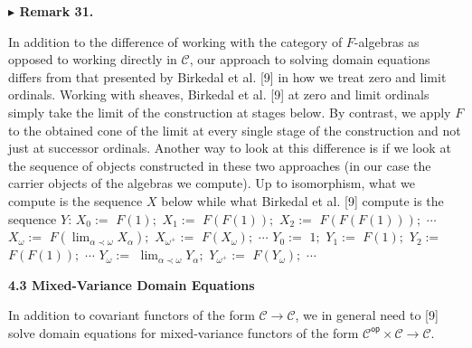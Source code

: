 \documentclass[10pt,a4paper]{article}
\begin{document}
 
 
\par\medskip\noindent\textbf{$\blacktriangleright$ Remark 31.}\par
 
 
In addition to the difference of working with the category of $F$-algebras as opposed to working directly in $\mathcal{C}$, our approach to solving domain equations differs from that presented by Birkedal et al. [9] in how we treat zero and limit ordinals. Working with sheaves, Birkedal et al. [9] at zero and limit ordinals simply take the limit of the construction at stages below. By contrast, we apply $F$ to the obtained cone of the limit at every single stage of the construction and not just at successor ordinals. Another way to look at this difference is if we look at the sequence of objects constructed in these two approaches (in our case the carrier objects of the algebras we compute). Up to isomorphism, what we compute is the sequence $X$ below while what Birkedal et al. [9] compute is the sequence $Y$:      $\displaystyle X_{0}:={}$ $\displaystyle F(1);$ $\displaystyle X_{1}:={}$ $\displaystyle F(F(1));$ $\displaystyle X_{2}:={}$ $\displaystyle F(F(F(1)));$ $\displaystyle\cdots$ $\displaystyle X_{\omega}:={}$ $\displaystyle F(\lim_{\alpha\prec\omega}X_{\alpha});$ $\displaystyle X_{{\omega}^{+}}:={}$ $\displaystyle F(X_{\omega});$ $\displaystyle\cdots$    $\displaystyle Y_{0}:={}$ $\displaystyle 1;$ $\displaystyle Y_{1}:={}$ $\displaystyle F(1);$ $\displaystyle Y_{2}:={}$ $\displaystyle F(F(1));$ $\displaystyle\cdots$ $\displaystyle Y_{\omega}:={}$ $\displaystyle\lim_{\alpha\prec\omega}Y_{\alpha};$ $\displaystyle Y_{{\omega}^{+}}:={}$ $\displaystyle F(Y_{\omega});$ $\displaystyle\cdots$\par
 
 
 

 
 
 
\par\medskip\noindent\textbf{4.3 Mixed-Variance Domain Equations}\par
 
 
In addition to covariant functors of the form $\mathcal{C}\to\mathcal{C}$, we in general need to [9] solve domain equations for mixed-variance functors of the form ${\mathcal{C}}^{\mathsf{op}}\times\mathcal{C}\to\mathcal{C}$.\par
 
\end{document}
